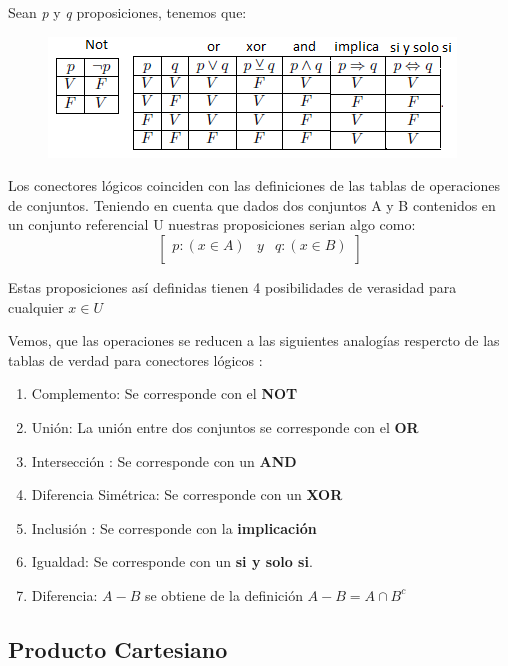 \documentclass[10pt]{article}
\begin{document}
Sean \textit{p} y \textit{q} proposiciones, tenemos que:
\begin{figure}[H]
		\centering
		 \includegraphics[scale=1]{figuras/tablasDeVerdad/img1.png}
\end{figure}
Los conectores lógicos coinciden con las definiciones de las tablas de operaciones de conjuntos. Teniendo en cuenta que dados dos conjuntos A y B contenidos en un conjunto referencial U nuestras proposiciones  serian algo como:
\begin{equation}
	\left[
	\begin{array}{ccc}
		p: (x \in A)  & y & q : (x \in B) \\
	\end{array}
\right]
\end{equation}


Estas proposiciones así definidas tienen 4 posibilidades de verasidad para cualquier $x \in U$

Vemos, que las operaciones se reducen a las siguientes analogías respercto de las tablas de verdad para conectores lógicos :
\begin{enumerate}
	\item Complemento:  Se corresponde con el \textbf{NOT}
	\item Unión:  La unión entre dos conjuntos se corresponde con el \textbf{OR}
	\item Intersección :  Se corresponde con un \textbf{AND}
	\item Diferencia Simétrica:  Se corresponde con un \textbf{XOR}
	\item Inclusión :  Se corresponde con la \textbf{implicación}
	\item Igualdad:  Se corresponde con un \textbf{si y solo si}. 
	\item Diferencia: $A - B$ se obtiene de la definición $A-B =  A \cap B^c$
\end{enumerate}

\begin{center}
\subsection{Producto Cartesiano} 
\end{center}
\end{document}
